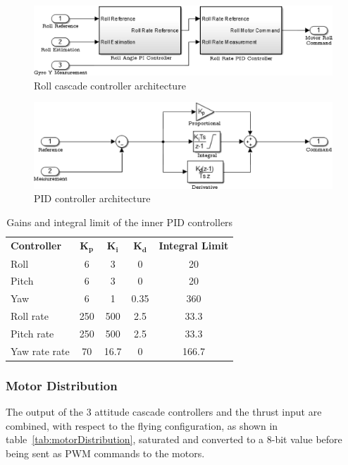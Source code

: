 \documentclass[a4paper, 12pt]{report}
\begin{document}
\begin{figure}[htbp]
\centering
\includegraphics[scale = 0.75]{Images/controllerCascade}
\caption{Roll cascade controller architecture}
\label{fig:controllerCascade}
\end{figure}

\begin{figure}[htbp]
\centering
\includegraphics[scale = 0.8]{Images/controllerPID}
\caption{PID controller architecture}
\label{fig:controllerPID}
\end{figure}

\begin{table}[htdp]
\caption{Gains and integral limit of the inner PID controllers}
\centering
\begin{tabular}{|l||c|c|c|c|}
\hline
\textbf{Controller} & $\boldsymbol{K_p}$ & $\boldsymbol{K_i}$ & $\boldsymbol{K_d}$ & \textbf{Integral Limit}  \\
\hhline{|=#=|=|=|=|}
Roll & 6 & 3 & 0 & 20  \\
\hline
Pitch & 6 & 3 & 0 & 20  \\
\hline
Yaw & 6 & 1 & 0.35 & 360  \\
\hline
Roll rate & 250 & 500 & 2.5 & 33.3  \\
\hline
Pitch rate & 250 & 500 & 2.5 & 33.3  \\
\hline
Yaw rate rate & 70 & 16.7 & 0 & 166.7  \\
\hline
\end{tabular}
\label{tab:controllerInnerGains}
\end{table}

\subsubsection{Motor Distribution}
The output of the 3 attitude cascade controllers and the thrust input are combined, with respect to the flying configuration, as shown in table~\ref{tab:motorDistribution}, saturated and converted to a 8-bit value before being sent as PWM commands to the motors. 
\end{document}
